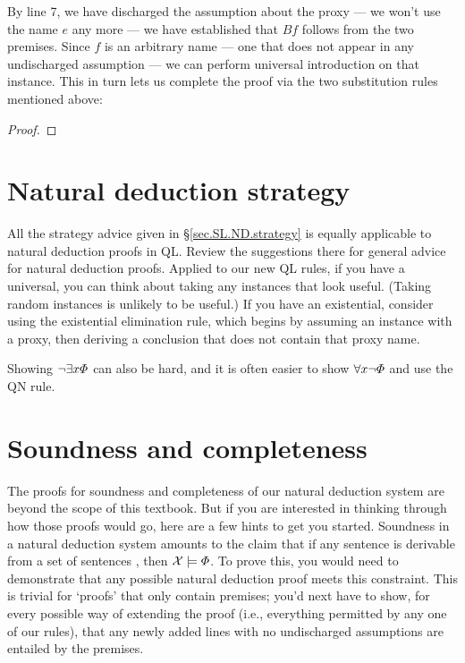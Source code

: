 By line 7, we have discharged the assumption about the proxy --- we won't use the name $e$ any more --- we have established that $Bf$ follows from the two premises. Since $f$ is an arbitrary name --- one that does not appear in any undischarged assumption --- we can perform universal introduction on that instance. This in turn lets us complete the proof via the two substitution rules mentioned above:

\begin{proof}
	 
	\open
	\close
\end{proof}



\section{Natural deduction strategy}

All the strategy advice given in \S\ref{sec.SL.ND.strategy} is equally applicable to natural deduction proofs in QL. Review the suggestions there for general advice for natural deduction proofs. Applied to our new QL rules, if you have a universal, you can think about taking any instances that look useful. (Taking random instances is unlikely to be useful.) If you have an existential, consider using the existential elimination rule, which begins by assuming an instance with a proxy, then deriving a conclusion that does not contain that proxy name.

Showing $\neg \exists x\varPhi{}$ can also be hard, and it is often easier to show  $\forall x\neg \varPhi{}$ and use the QN rule.



\section{Soundness and completeness}

The proofs for soundness and completeness of our natural deduction system are beyond the scope of this textbook. But if you are interested in thinking through how those proofs would go, here are a few hints to get you started. Soundness in a natural deduction system amounts to the claim that if any sentence \metaA{} is derivable from a set of sentences \metaSetX{}, then $\mathcal{X}{}\models\varPhi{}$. To prove this, you would need to demonstrate that any possible natural deduction proof meets this constraint. This is trivial for `proofs' that only contain premises; you'd next have to show, for every possible way of extending the proof (i.e., everything permitted by any one of our rules), that any newly added lines with no undischarged assumptions are entailed by the premises.

